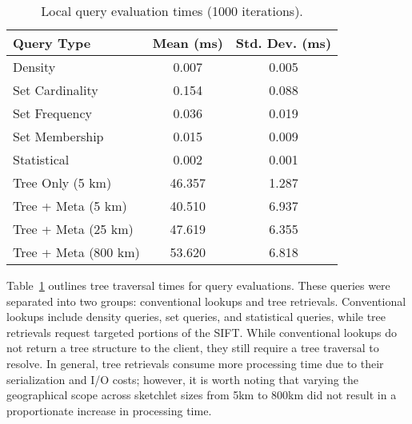 \begin{table}
    \renewcommand{\arraystretch}{1.2}
    \caption{Local query evaluation times (1000 iterations). \vspace{-1em}}
    \label{tbl:query-times}
    \begin{center}
        \begin{tabular}{|l|c|c|}
            \hline
            \textbf{Query Type}      & \textbf{Mean (ms)} & \textbf{Std. Dev. (ms)} \\
            \hline
            Density                  & 0.007                    & 0.005 \\
            \hline
            Set Cardinality          & 0.154                    & 0.088 \\
            \hline
            Set Frequency            & 0.036                    & 0.019 \\
            \hline
            Set Membership           & 0.015                    & 0.009 \\
            \hline
            Statistical               & 0.002                    & 0.001 \\
            \hline
            \hline
            Tree Only (5 km)        & 46.357                   & 1.287 \\
            \hline
            Tree + Meta (5 km)      & 40.510                   & 6.937 \\
            \hline
            Tree + Meta (25 km)     & 47.619                   & 6.355 \\
            \hline
            Tree + Meta (800 km)    & 53.620                   & 6.818 \\
            \hline
        \end{tabular}
    \end{center}
    \vspace{-2em}
\end{table}
Table~\ref{tbl:query-times} outlines tree traversal times for query evaluations. These queries were separated into two groups: conventional lookups and tree retrievals. Conventional lookups include density queries, set queries, and statistical queries, while tree retrievals request targeted portions of the SIFT.  While conventional lookups do not return a tree structure to the client, they still require a tree traversal to resolve. In general, tree retrievals consume more processing time due to their serialization and I/O costs; however, it is worth noting that varying the geographical scope across sketchlet sizes from 5km to 800km did not result in a proportionate increase in processing time.%

